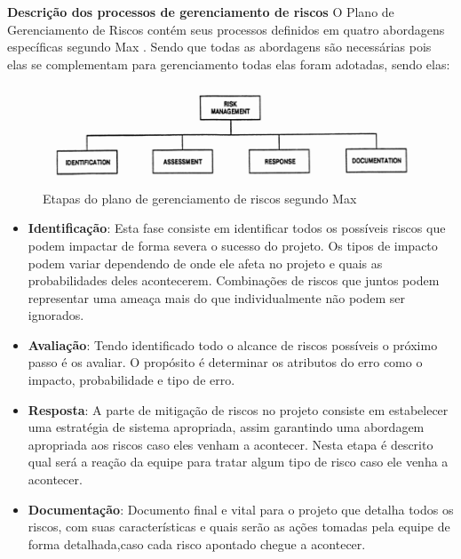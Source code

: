 		\textbf{Descrição dos processos de gerenciamento de riscos}
		O Plano de Gerenciamento de Riscos contém seus processos definidos em quatro abordagens específicas segundo Max \cite{wideman1992project}. Sendo que todas as abordagens são necessárias pois elas se complementam para gerenciamento todas elas foram adotadas, sendo elas:
		
		\graphicspath{{figuras/}}
		\begin{figure}[h]
			\centering
			\includegraphics[scale=0.80]{EAP_Gerenciamento_de_Riscos.png}
			\caption{Etapas do plano de gerenciamento de riscos segundo Max \cite{wideman1992project}}
			\label{img:eap_gerenciamento_de_risco}
		\end{figure}
		
		\begin{itemize}
			\item \textbf{Identificação}: Esta fase consiste em identificar todos os possíveis riscos que podem impactar de forma severa o sucesso do projeto. Os tipos de impacto podem variar dependendo de onde ele afeta no projeto e quais as probabilidades deles acontecerem. Combinações de riscos que juntos podem representar uma ameaça mais do que individualmente não podem ser ignorados.
			\item \textbf{Avaliação}: Tendo identificado todo o alcance de riscos possíveis o próximo passo é os avaliar. O propósito é determinar os atributos do erro como o impacto, probabilidade e tipo de erro.
			\item \textbf{Resposta}: A parte de mitigação de riscos no projeto consiste em estabelecer uma estratégia de sistema apropriada, assim garantindo uma abordagem apropriada aos riscos caso eles venham a acontecer. Nesta etapa é descrito qual será a reação da equipe para tratar algum tipo de risco caso ele venha a acontecer.
			\item \textbf{Documentação}: Documento final e vital para o projeto que detalha todos os riscos, com suas características e quais serão as ações tomadas pela equipe de forma detalhada,caso cada risco apontado chegue a acontecer.
		\end{itemize}
		
